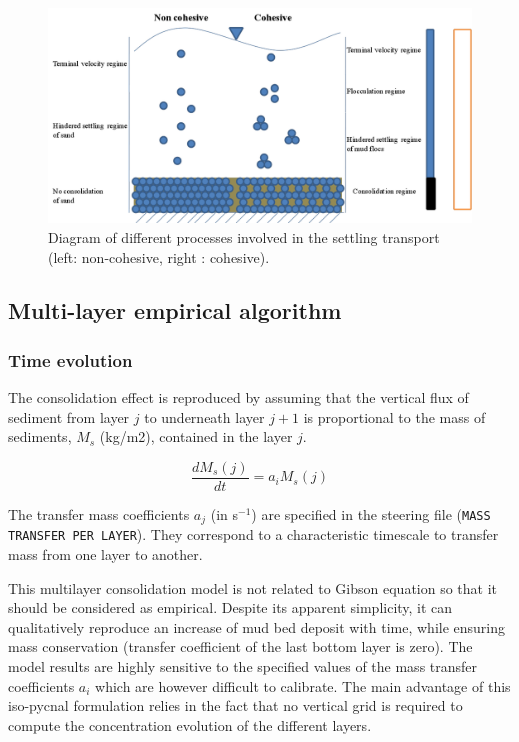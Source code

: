 \begin{figure}[H]
\begin{center}
\includegraphics[scale=0.30,angle=0]{graphics/fig3.png}
\caption{Diagram of different processes involved in the settling transport
(left: non-cohesive, right : cohesive).}\label{fig:3}
\end{center}
\end{figure}

\subsection{Multi-layer empirical algorithm}\label{sec:4.2}

\subsubsection*{Time evolution}

The consolidation effect is reproduced by assuming that the vertical flux of
sediment from layer $j$ to underneath layer $j+1$ is proportional to the mass of
sediments, $M_s$ (kg/m2), contained in the layer $j$.

\begin{equation}\label{eq:eq8}
\frac{dM_s(j)}{dt} = a_i M_s(j) 
\end{equation}

The transfer mass coefficients $a_j$ (in s$^{-1}$) are specified in the
steering file (\texttt{MASS TRANSFER PER LAYER}). They correspond to a
characteristic timescale to transfer mass from one layer to another.

This multilayer consolidation model is not related to Gibson equation so
that it should be considered as empirical. Despite its apparent simplicity,
it can qualitatively reproduce an increase of mud bed deposit with time,
while ensuring mass conservation (transfer coefficient of the last bottom
layer is zero). The model results are highly sensitive to the specified
values of the mass transfer coefficients $a_i$ which are however difficult
to calibrate. The main advantage of this iso-pycnal formulation relies in
the fact that no vertical grid is required to compute the concentration
evolution of the different layers.

